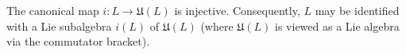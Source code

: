 The canonical map $i: L \to \mathfrak{U}(L)$ is injective. Consequently, $L$ may be identified with a Lie subalgebra $i(L)$ of $\mathfrak{U}(L)$ (where $\mathfrak{U}(L)$ is viewed as a Lie algebra via the commutator bracket).
